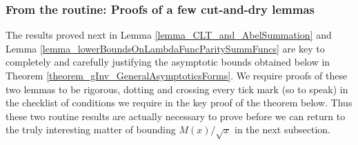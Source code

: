 \documentclass[11pt,reqno,a4letter]{article}
\numberwithin{figure}{section}
\numberwithin{table}{section}
\theoremstyle{plain}
\numberwithin{theorem}{section}
\theoremstyle{definition}
\begin{document}
\subsubsection{From the routine: Proofs of a few cut-and-dry lemmas} 


The results proved next in Lemma \ref{lemma_CLT_and_AbelSummation} and 
Lemma \ref{lemma_lowerBoundsOnLambdaFuncParitySummFuncs} 
are key to completely and carefully justifying the 
asymptotic bounds obtained below in Theorem \ref{theorem_gInv_GeneralAsymptoticsForms}. 
We require proofs of these two lemmas to be rigorous, dotting and 
crossing every tick mark (so to speak) in the 
checklist of conditions we require in the key proof of the theorem below. 
Thus these two routine results are actually necessary to prove before we can return to the truly 
interesting matter of bounding $M(x) / \sqrt{x}$ in the next subsection. 
\end{document}
